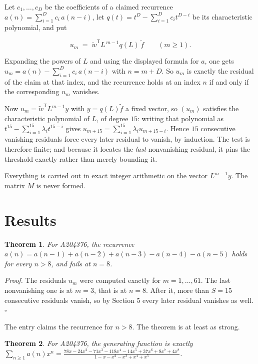 \documentclass[11pt]{article}
\newtheorem{theorem}{Theorem}
\theoremstyle{definition}
\begin{document}
Let $c_1,\dots,c_D$ be the coefficients of a claimed recurrence $a(n) = \sum_{i=1}^{D} c_i\,a(n-i)$, let $q(t) = t^{D} - \sum_{i=1}^{D} c_i t^{D-i}$ be its characteristic polynomial, and put

\[u_m \;=\; \tilde w^{\mathsf T} L^{\,m-1} q(L)\,\tilde f \qquad (m \ge 1).\]

Expanding the powers of $L$ and using the displayed formula for $a$, one gets $u_m = a(n) - \sum_{i=1}^{D} c_i\,a(n-i)$ with $n = m + D$. So $u_m$ is exactly the residual of the claim at that index, and the recurrence holds at an index $n$ if and only if the corresponding $u_m$ vanishes.

Now $u_m = \tilde w^{\mathsf T} L^{m-1} y$ with $y = q(L)\tilde f$ a fixed vector, so $(u_m)$ satisfies the characteristic polynomial of $L$, of degree $15$: writing that polynomial as $t^{15} - \sum_{i=1}^{15} \lambda_i t^{15-i}$ gives $u_{m+15} = \sum_{i=1}^{15} \lambda_i u_{m+15-i}$. Hence $15$ consecutive vanishing residuals force every later residual to vanish, by induction. The test is therefore finite; and because it locates the {\itshape last} nonvanishing residual, it pins the threshold exactly rather than merely bounding it.

Everything is carried out in exact integer arithmetic on the vector $L^{m-1}y$. The matrix $M$ is never formed.

\section{Results}

\begin{theorem} For A204376, the recurrence $a(n) = a(n-1) + a(n-2) + a(n-3) - a(n-4) - a(n-5)$ holds for every $n > 8$, and fails at $n = 8$.\end{theorem}

{\itshape Proof.} The residuals $u_m$ were computed exactly for $m = 1,\dots,61$. The last nonvanishing one is at $m = 3$, that is at $n = 8$. After it, more than $S = 15$ consecutive residuals vanish, so by Section 5 every later residual vanishes as well. $\square$

The entry claims the recurrence for $n > 8$. The theorem is at least as strong.

\begin{theorem} For A204376, the generating function is exactly $\sum_{n\ge 1} a(n)x^n = \frac{78x - 24x^{2} - 71x^{3} - 118x^{4} - 14x^{5} + 37x^{6} + 8x^{7} + 4x^{8}}{1 - x - x^{2} - x^{3} + x^{4} + x^{5}}$.\end{theorem}
\end{document}
